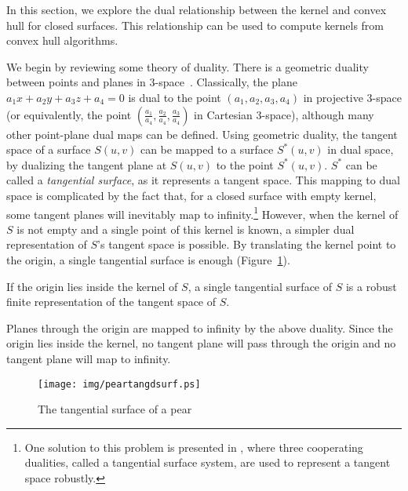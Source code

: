\documentclass{acmsiggraph}
\begin{document}
In this section, we explore the dual relationship between the kernel and convex hull
for closed surfaces.
This relationship can be used to compute kernels from convex hull algorithms.

We begin by reviewing some theory of duality.
There is a geometric duality between points and planes in 3-space~\cite{Pottmann}.
Classically, the plane $a_1x + a_2y + a_3z + a_4=0$ is dual to the point
$(a_1,a_2,a_3,a_4)$
in projective 3-space
(or equivalently, the point
$(\frac{a_1}{a_4},\frac{a_2}{a_4},\frac{a_3}{a_4})$ in Cartesian 3-space),
although many other point-plane dual maps can be defined.
Using geometric duality, the tangent space of a surface $S(u,v)$ can be
mapped
to a surface $S^*(u,v)$ in dual space, by dualizing the tangent plane at
$S(u,v)$ to the point $S^*(u,v)$.
$S^*$ can be called a {\em tangential surface}, as it represents a
tangent space.
This mapping to dual space is complicated by the fact that, for a closed
surface with empty kernel,
some tangent planes will inevitably map to infinity.\footnote{One
solution to this problem is presented in \cite{jj04tangsurf},
where three cooperating dualities, called a tangential surface system,
are used to represent a tangent space robustly.}
However, when the kernel of $S$ is not empty and a single point of this
kernel is known,
a simpler dual representation of $S$'s tangent space is possible.
By translating the kernel point to the origin,
a single tangential surface is enough (Figure~\ref{fig:peartangdsurf}).

\begin{lemma}
\label{lem:drobust}
If the origin lies inside the kernel of $S$,
a single tangential surface of $S$ is a robust finite representation of
the tangent space of $S$.
\end{lemma}
\prf
Planes through the origin are mapped to infinity by the above duality.
Since the origin lies inside the kernel,
no tangent plane will pass through the origin and no tangent plane will map to infinity.
\QED

\begin{figure}
\begin{center}
\texttt{[image: img/peartangdsurf.ps]}
\end{center}
\vskip -0.2in
\caption{The tangential surface of a pear}
\label{fig:peartangdsurf}
\end{figure}

\end{document}
